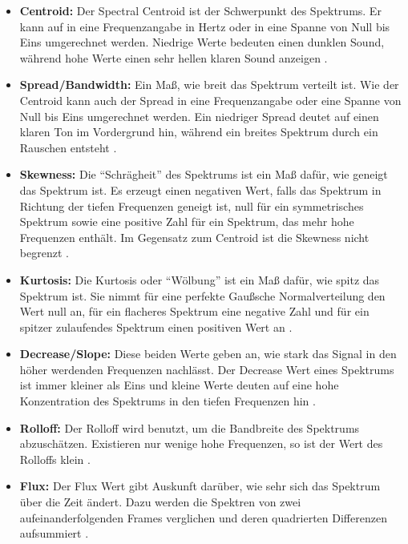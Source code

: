 \documentclass[11pt,a4paper]{article}
\begin{document}
\begin{itemize}
\item \textbf{Centroid:} Der Spectral Centroid ist der Schwerpunkt des Spektrums. Er kann auf in eine Frequenzangabe in Hertz oder in eine Spanne von Null bis Eins umgerechnet werden. Niedrige Werte bedeuten einen dunklen Sound, während hohe Werte einen sehr hellen klaren Sound anzeigen \cite[S. 45 f.]{lerch2012introduction}.

\item \textbf{Spread/Bandwidth:} Ein Maß, wie breit das Spektrum verteilt ist. Wie der Centroid kann auch der Spread in eine Frequenzangabe oder eine Spanne von Null bis Eins umgerechnet werden. Ein niedriger Spread deutet auf einen klaren Ton im Vordergrund hin, während ein breites Spektrum durch ein Rauschen entsteht \cite[S. 47 f.]{lerch2012introduction}.

\item \textbf{Skewness:} Die ``Schrägheit'' des Spektrums ist ein Maß dafür, wie geneigt das Spektrum ist. Es erzeugt einen negativen Wert, falls das Spektrum in Richtung der tiefen Frequenzen geneigt ist, null für ein symmetrisches Spektrum sowie eine positive Zahl für ein Spektrum, das mehr hohe Frequenzen enthält. Im Gegensatz zum Centroid ist die Skewness nicht begrenzt \cite[S. 38 f.]{lerch2012introduction}.

\item \textbf{Kurtosis:} Die Kurtosis oder ``Wölbung'' ist ein Maß dafür, wie spitz das Spektrum ist. Sie nimmt für eine perfekte Gaußsche Normalverteilung den Wert null an, für ein flacheres Spektrum eine negative Zahl und für ein spitzer zulaufendes Spektrum einen positiven Wert an \cite[S. 39 f.]{lerch2012introduction}.

\item \textbf{Decrease/Slope:} Diese beiden Werte geben an, wie stark das Signal in den höher werdenden Frequenzen nachlässt. Der Decrease Wert eines Spektrums ist immer kleiner als Eins und kleine Werte deuten auf eine hohe Konzentration des Spektrums in den tiefen Frequenzen hin \cite[S. 49 f.]{lerch2012introduction}.

\item \textbf{Rolloff:} Der Rolloff wird benutzt, um die Bandbreite des Spektrums abzuschätzen. Existieren nur wenige hohe Frequenzen, so ist der Wert des Rolloffs klein \cite[S. 42 f.]{lerch2012introduction}.

\item \textbf{Flux:} Der Flux Wert gibt Auskunft darüber, wie sehr sich das Spektrum über die Zeit ändert. Dazu werden die Spektren von zwei aufeinanderfolgenden Frames verglichen und deren quadrierten Differenzen aufsummiert \cite[S. 44 f.]{lerch2012introduction}.


\end{itemize}
\end{document}
